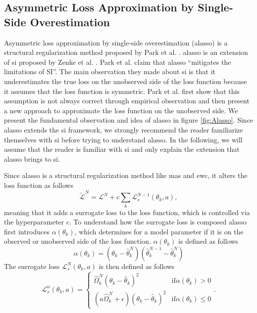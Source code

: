 \subsection{Asymmetric Loss Approximation by Single-Side Overestimation}
\label{sec:Related_work:Continual_Learning:ALASSO}
Asymmetric loss approximation by single-side overestimation (\gls{alasso}) is a structural regularization method proposed by Park et al. \cite{park2019continual}.
\gls{alasso} is an extension of \gls{si} proposed by Zenke et al. \cite{zenke2017continual}. Park et al. claim that \gls{alasso} \enquote{mitigates the limitations of SI}.
The main observation they made about \gls{si} is that it underestimates the true loss on the unobserved side of the loss
function because it assumes that the loss function is symmetric. Park et al. first show that this assumption is not always correct through empirical observation
and then present a new approach to approximate the loss function on the unobserved side. We present the fundamental observation and idea of \gls{alasso} in figure
\ref{fig:Alasso}. Since \gls{alasso} extends the \gls{si} framework, we strongly recommend the reader familiarize themselves with \gls{si} before
trying to understand \gls{alasso}. In the following, we will assume that the reader is familiar with \gls{si} and only explain the extension that \gls{alasso}
brings to \gls{si}. \par
Since \gls{alasso} is a structural regularization method like \gls{mas} and \gls{ewc}, it alters the loss function as follows
\begin{equation}
    \tilde{\mathcal{L}}^N = \mathcal{L}^N + c \sum_k \mathcal{L}_s^{N-1}(\theta_k,a),
\end{equation}
meaning that it adds a surrogate loss to the loss function, which is controlled via the hyperparameter $c$. To understand how the surrogate loss is composed
\gls{alasso} first introduces $\alpha(\theta_k)$, which determines for a model parameter if it is on the observed or unobserved side of the loss function.
$\alpha(\theta_k)$ is defined as follows
\begin{equation}
    \alpha(\theta_k) = (\theta_k - \hat{\theta}^N_k) (\hat{\theta}^{N-1}_k - \hat{\theta}^N_k)
\end{equation}
The surrogate loss $\mathcal{L}^N_s(\theta_k,a)$ is then defined as follows
\begin{equation}
    \mathcal{L}_s^n(\theta_k,a) = \begin{cases} \hat{\Omega}^N_k (\theta_k - \hat{\theta}_k)^2 & \text{if} \alpha(\theta_k) > 0 \\
    (a \hat{\Omega}^N_k + \epsilon)(\theta_k - \hat{\theta}_k)^2 & \text{if} \alpha(\theta_k) \leq 0 \end{cases}.
\end{equation}
